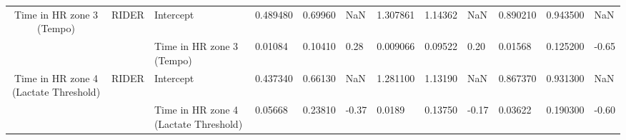 \begin{tabular}{c}
Time in HR zone 3 (Tempo) & RIDER & Intercept &  0.489480 &  0.69960 &   NaN &  1.307861 &  1.14362 &   NaN &   0.890210 &  0.943500 &   NaN \\
                                      &       & Time in HR zone 3 (Tempo) &   0.01084 &  0.10410 &  0.28 &  0.009066 &  0.09522 &  0.20 &    0.01568 &  0.125200 & -0.65 \\
Time in HR zone 4 (Lactate Threshold) & RIDER & Intercept &  0.437340 &  0.66130 &   NaN &  1.281100 &  1.13190 &   NaN &   0.867370 &  0.931300 &   NaN \\
                                      &       & Time in HR zone 4 (Lactate Threshold) &   0.05668 &  0.23810 & -0.37 &    0.0189 &  0.13750 & -0.17 &    0.03622 &  0.190300 & -0.60 \\
\bottomrule
\end{tabular}
